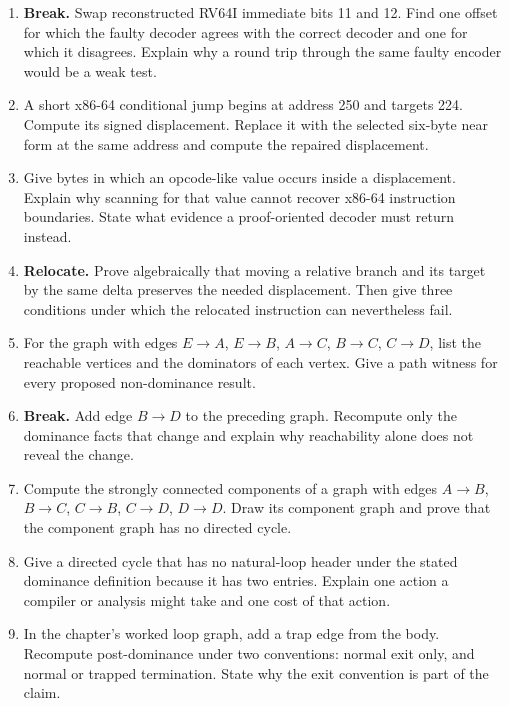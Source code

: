 \begin{enumerate}
\item \textbf{Break.} Swap reconstructed RV64I immediate bits 11 and 12.
Find one offset for which the faulty decoder agrees with the correct decoder
and one for which it disagrees. Explain why a round trip through the same
faulty encoder would be a weak test.

\item A short x86-64 conditional jump begins at address 250 and targets 224.
Compute its signed displacement. Replace it with the selected six-byte near
form at the same address and compute the repaired displacement.

\item Give bytes in which an opcode-like value occurs inside a displacement.
Explain why scanning for that value cannot recover x86-64 instruction
boundaries. State what evidence a proof-oriented decoder must return instead.

\item \textbf{Relocate.} Prove algebraically that moving a relative branch and
its target by the same delta preserves the needed displacement. Then give
three conditions under which the relocated instruction can nevertheless fail.

\item For the graph with edges \(E\to A\), \(E\to B\), \(A\to C\),
\(B\to C\), \(C\to D\), list the reachable vertices and the dominators of
each vertex. Give a path witness for every proposed non-dominance result.

\item \textbf{Break.} Add edge \(B\to D\) to the preceding graph. Recompute
only the dominance facts that change and explain why reachability alone does
not reveal the change.

\item Compute the strongly connected components of a graph with edges
\(A\to B\), \(B\to C\), \(C\to B\), \(C\to D\), \(D\to D\). Draw its
component graph and prove that the component graph has no directed cycle.

\item Give a directed cycle that has no natural-loop header under the stated
dominance definition because it has two entries. Explain one action a compiler
or analysis might take and one cost of that action.

\item In the chapter's worked loop graph, add a trap edge from the body.
Recompute post-dominance under two conventions: normal exit only, and normal
or trapped termination. State why the exit convention is part of the claim.


\end{enumerate}

